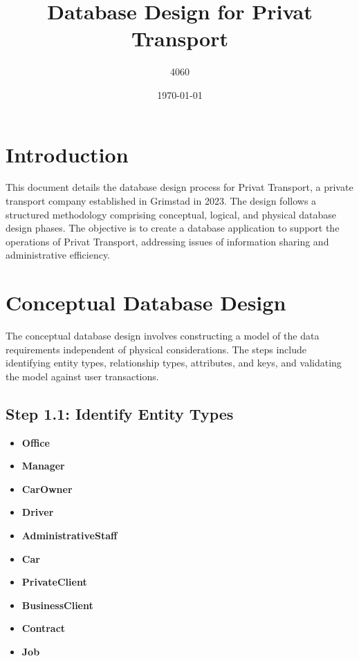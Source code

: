 \documentclass[a4paper,12pt]{article}
\title{Database Design for Privat Transport}
\author{4060}
\date{\today}
\begin{document}
\maketitle

\section*{Introduction}
This document details the database design process for Privat Transport, a private transport company established in Grimstad in 2023. The design follows a structured methodology comprising conceptual, logical, and physical database design phases. The objective is to create a database application to support the operations of Privat Transport, addressing issues of information sharing and administrative efficiency.

\section*{Conceptual Database Design}
The conceptual database design involves constructing a model of the data requirements independent of physical considerations. The steps include identifying entity types, relationship types, attributes, and keys, and validating the model against user transactions.

\subsection*{Step 1.1: Identify Entity Types}
\begin{itemize}
    \item \textbf{Office}
    \item \textbf{Manager}
    \item \textbf{CarOwner}
    \item \textbf{Driver}
    \item \textbf{AdministrativeStaff}
    \item \textbf{Car}
    \item \textbf{PrivateClient}
    \item \textbf{BusinessClient}
    \item \textbf{Contract}
    \item \textbf{Job}
\end{itemize}
\end{document}

